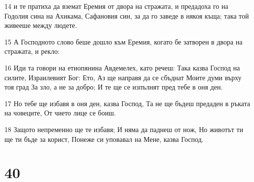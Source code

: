 \par 14 и те пратиха да вземат Еремия от двора на стражата, и предадоха го на Годолия сина на Ахикама, Сафановия син, за да го заведе в някоя къща; така той живееше между людете.
\par 15 А Господното слово беше дошло към Еремия, когато бе затворен в двора на стражата, и рекло:
\par 16 Иди та говори на етиопянина Авдемелех, като речеш: Така казва Господ на силите, Израилевият Бог: Ето, Аз ще направя да се сбъднат Моите думи върху тоя град За зло, а не за добро; И те ще се изпълнят пред тебе в оня ден.
\par 17 Но тебе ще избавя в оня ден, казва Господ, Та не ще бъдеш предаден в ръката на човеците, От чието лице се боиш.
\par 18 Защото непременно ще те избавя; И няма да паднеш от нож, Но животът ти ще ти бъде за корист, Понеже си уповавал на Мене, казва Господ.

\chapter{40}

